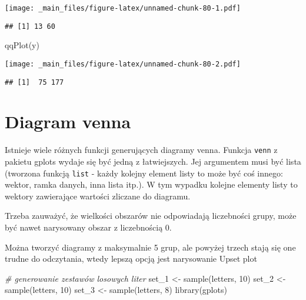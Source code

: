 \documentclass[
]{book}
\newenvironment{Shaded}{\begin{snugshade}}{\end{snugshade}}
\newcommand{\CommentTok}[1]{\textcolor[rgb]{0.56,0.35,0.01}{\textit{#1}}}
\newcommand{\DecValTok}[1]{\textcolor[rgb]{0.00,0.00,0.81}{#1}}
\newcommand{\FunctionTok}[1]{\textcolor[rgb]{0.00,0.00,0.00}{#1}}
\newcommand{\NormalTok}[1]{#1}
\newcommand{\OtherTok}[1]{\textcolor[rgb]{0.56,0.35,0.01}{#1}}
\begin{document}
\texttt{[image: \_main\_files/figure-latex/unnamed-chunk-80-1.pdf]}

\begin{verbatim}
## [1] 13 60
\end{verbatim}

\begin{Shaded}
\begin{Highlighting}[]
\FunctionTok{qqPlot}\NormalTok{(y)}
\end{Highlighting}
\end{Shaded}

\texttt{[image: \_main\_files/figure-latex/unnamed-chunk-80-2.pdf]}

\begin{verbatim}
## [1]  75 177
\end{verbatim}

\hypertarget{diagram-venna}{%
\section{Diagram venna}\label{diagram-venna}}

Istnieje wiele różnych funkcji generujących diagramy venna. Funkcja \texttt{venn} z pakietu gplots wydaje się być jedną z łatwiejszych. Jej argumentem musi być lista (tworzona funkcją \texttt{list} - każdy kolejny element listy to może być coś innego: wektor, ramka danych, inna lista itp.). W tym wypadku kolejne elementy listy to wektory zawierające wartości zliczane do diagramu.

Trzeba zauważyć, że wielkości obszarów nie odpowiadają liczebności grupy, może być nawet narysowany obszar z liczebnością 0.

Można tworzyć diagramy z maksymalnie 5 grup, ale powyżej trzech stają się one trudne do odczytania, wtedy lepszą opcją jest narysowanie Upset plot

\begin{Shaded}
\begin{Highlighting}[]
\CommentTok{\# generowanie zestawów losowych liter}
\NormalTok{set\_1 }\OtherTok{\textless{}{-}} \FunctionTok{sample}\NormalTok{(letters, }\DecValTok{10}\NormalTok{)}
\NormalTok{set\_2 }\OtherTok{\textless{}{-}} \FunctionTok{sample}\NormalTok{(letters, }\DecValTok{10}\NormalTok{)}
\NormalTok{set\_3 }\OtherTok{\textless{}{-}} \FunctionTok{sample}\NormalTok{(letters, }\DecValTok{8}\NormalTok{)}
\FunctionTok{library}\NormalTok{(gplots)}
\end{Highlighting}
\end{Shaded}
\end{document}
